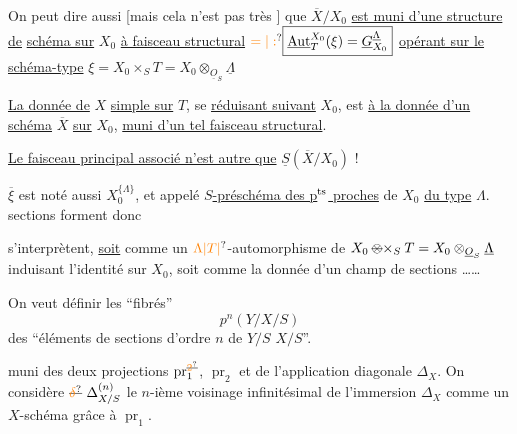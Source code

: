 On peut dire aussi [mais cela n'est pas très ] que $\overline X/X_0$ \uline{est muni d'une structure de}  \uline{schéma sur} $X_0$ \uline{à faisceau structural} $\unsure{=|:}\boxed{\underline{\operatorname{Aut}}_T^{X_0}(\xi)=\underline G_{X_0}^{\underline{\Lambda}}}$ \uline{opérant sur le schéma-type} $\xi=X_0\times_S T=X_0\otimes_{\underline{O}_S}\underline{\Lambda}$

\uline{La donnée de} $X$ \uline{simple sur} $T$, se \uline{réduisant suivant} $X_0$, est  \uline{à la donnée d'un schéma} $\overline X$ \uline{sur} $X_0$, \uline{muni d'un tel faisceau structural}.

\uline{Le faisceau principal associé n'est autre que} $\underline S(\overline X/X_0)$ !

$\overline\xi$ est noté aussi $X_0^{\{\Lambda\}}$, et appelé  \uline{$S$-préschéma des p$^{\rm ts}$ proches} de $X_0$ \uline{du type} $\Lambda$.  sections  forment donc

s'interprètent, \uline{soit} comme un $\unsure{\Lambda|T|{}}$-automorphisme de $X_0\mathbin{\deleted{\otimes}\times}_S T=X_0\otimes_{\underline{O}_S}\underline\Lambda$ induisant l'identité sur $X_0$, soit comme la donnée d'un champ de sections  \ldots\ldots
\margin{\unsure{---}}


On veut définir les ``fibrés''
\[
p^n(Y/X/S)
\]
des  ``éléments de sections d'ordre $n$ de $Y/S$  $X/S$''.

 muni des deux projections $\operatorname{pr}^{\deleted{\unsure{2}}}_1$, $\operatorname{pr}_2$ et de l'application diagonale $\Delta_X$. On considère $\deleted{\unsure{\delta}}\ \Delta^{(n)}_{X/S}$ le $n$-ième voisinage infinitésimal de l'immersion $\Delta_X$ comme un $X$-schéma grâce à $\operatorname{pr}_1$.

